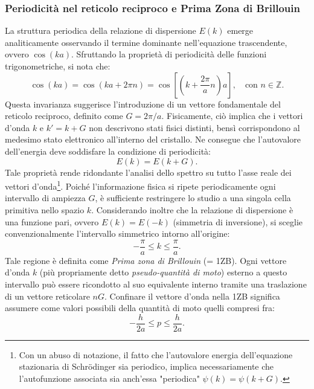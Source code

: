 \documentclass[a4paper,11pt]{report}
\begin{document}
\subsubsection{Periodicità nel reticolo reciproco e Prima Zona di Brillouin}
La struttura periodica della relazione di dispersione $E(k)$ emerge analiticamente osservando il termine dominante nell'equazione trascendente, ovvero $\cos(ka)$. Sfruttando la proprietà di periodicità delle funzioni trigonometriche, si nota che:
\begin{equation}
    \cos(ka) = \cos(ka + 2\pi n) = \cos\left[\left(k + \frac{2\pi}{a}n\right)a\right], \quad \text{con } n \in \mathbb{Z}.
\end{equation}
Questa invarianza suggerisce l'introduzione di un vettore fondamentale del reticolo reciproco, definito come $G = 2\pi/a$.
Fisicamente, ciò implica che i vettori d'onda $k$ e $k' = k+G$ non descrivono stati fisici distinti, bensì corrispondono al medesimo stato elettronico all'interno del cristallo. Ne consegue che l'autovalore dell'energia deve soddisfare la condizione di periodicità:
\begin{equation}
    E(k) = E(k+G).
\end{equation}
Tale proprietà rende ridondante l'analisi dello spettro su tutto l'asse reale dei vettori d'onda\footnote{Con un abuso di notazione, il fatto che l'autovalore energia dell'equazione stazionaria di Schrödinger sia periodico, implica necessariamente che l'autofunzione associata sia anch'essa "periodica" $\psi(k) = \psi(k+G)$.}. Poiché l'informazione fisica si ripete periodicamente ogni intervallo di ampiezza $G$, è sufficiente restringere lo studio a una singola cella primitiva nello spazio $k$.
Considerando inoltre che la relazione di dispersione è una funzione pari, ovvero $E(k) = E(-k)$ (simmetria di inversione), si sceglie convenzionalmente l'intervallo simmetrico intorno all'origine:
\begin{equation}
    -\frac{\pi}{a} \leq k \leq \frac{\pi}{a}.
\end{equation}
Tale regione è definita come \textit{Prima zona di Brillouin} (= 1ZB). Ogni vettore d'onda $k$ (più propriamente detto \textit{pseudo-quantità di moto}) esterno a questo intervallo può essere ricondotto al suo equivalente interno tramite una traslazione di un vettore reticolare $nG$. Confinare il vettore d'onda nella 1ZB significa assumere come valori possibili della quantità di moto quelli compresi fra:
\begin{equation}
    -\frac{h}{2a} \leq p \leq \frac{h}{2a}.
\end{equation}
\end{document}
